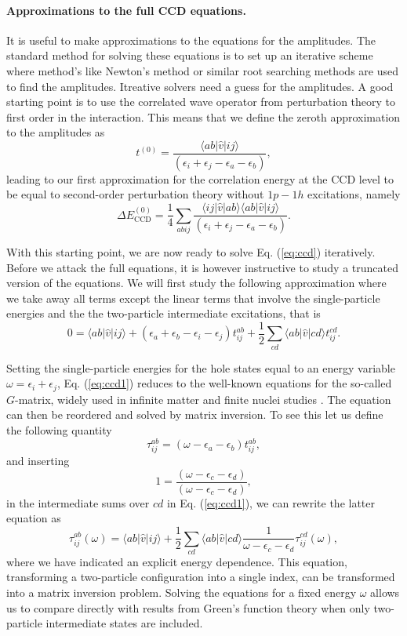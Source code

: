 \paragraph{Approximations to the full CCD equations.}
It is useful to make approximations to the equations for the amplitudes. The standard method for solving these equations is to set up an iterative scheme where method's like Newton's method or similar root searching methods are used to find the amplitudes. 
Itreative solvers need a guess for the amplitudes. A good starting point is to use the correlated wave operator from perturbation theory to
first order in the interaction.
This means that we define the zeroth approximation to the amplitudes as 
\[
t^{(0)}=\frac{\langle ab \vert \hat{v} \vert ij \rangle}{\left(\epsilon_i+\epsilon_j-\epsilon_a-\epsilon_b\right)},
\]
leading to our first approximation for the correlation energy at the CCD level to be equal to second-order perturbation theory without $1p-1h$ excitations, namely
\[
\Delta E_{\mathrm{CCD}}^{(0)}=\frac{1}{4}\sum_{abij} \frac{\langle ij \vert \hat{v} \vert ab \rangle \langle ab \vert \hat{v} \vert ij \rangle}{\left(\epsilon_i+\epsilon_j-\epsilon_a-\epsilon_b\right)}.
\]

With this starting point, we are now ready to solve Eq. (\ref{eq:ccd}) iteratively. Before we attack the full equations, it is however instructive to study a truncated version of the equations. We will first study the following approximation where we take away all terms except the linear terms that involve the single-particle energies and the the two-particle intermediate excitations, that is
\begin{equation}
0 = \langle ab \vert \hat{v} \vert ij \rangle + \left(\epsilon_a+\epsilon_b-\epsilon_i-\epsilon_j\right)t_{ij}^{ab}+\frac{1}{2}\sum_{cd} \langle ab \vert \hat{v} \vert cd \rangle t_{ij}^{cd}.
\label{eq:ccd1}
\end{equation}

Setting the single-particle energies for the hole states equal to an energy variable $\omega = \epsilon_i+\epsilon_j$, Eq. (\ref{eq:ccd1}) reduces to the
well-known equations for the so-called $G$-matrix, widely used in infinite matter and finite nuclei studies \cite{hh2000}. 
The equation can then be reordered and 
solved by matrix inversion.  To see this let us define the following quantity
\[
\tau_{ij}^{ab}= \left(\omega-\epsilon_a-\epsilon_b\right)t_{ij}^{ab},
\]
and inserting 
\[
1=\frac{\left(\omega-\epsilon_c-\epsilon_d\right)}{\left(\omega-\epsilon_c-\epsilon_d\right)},
\]
in the intermediate sums over $cd$ in Eq. (\ref{eq:ccd1}), we can rewrite the latter equation as
\[
\tau_{ij}^{ab}(\omega)= \langle ab \vert \hat{v} \vert ij \rangle + \frac{1}{2}\sum_{cd} \langle ab \vert \hat{v} \vert cd \rangle \frac{1}{\omega-\epsilon_c-\epsilon_d}\tau_{ij}^{cd}(\omega),
\]
where we have indicated an explicit energy dependence. This equation, transforming a two-particle configuration into a single index, can be transformed into a matrix inversion problem.  Solving the equations for a fixed energy $\omega$ allows us to compare directly with results from Green's function theory when only two-particle intermediate states are included. 

